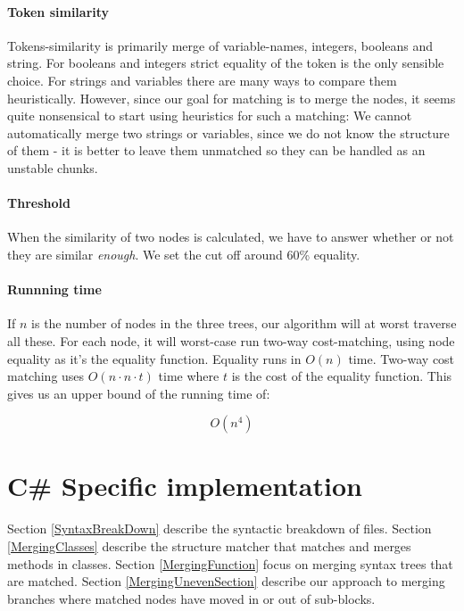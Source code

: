 \documentclass[11pt]{article}
\begin{document}
\paragraph{Token similarity} Tokens-similarity is primarily merge of variable-names, integers, booleans and string. For booleans and integers strict equality of the token is the only sensible choice. For strings and variables there are many ways to compare them heuristically. However, since our goal for matching is to merge the nodes, it seems quite nonsensical to start using heuristics for such a matching: We cannot automatically merge two strings or variables, since we do not know the structure of them - it is better to leave them unmatched so they can be handled as an unstable chunks.

\paragraph{Threshold} When the similarity of two nodes is calculated, we have to answer whether or not they are similar \textit{enough}. We set the cut off around 60\% equality.


\paragraph{Runnning time} If $n$ is the number of nodes in the three trees, our algorithm will at worst traverse all these. For each node, it will worst-case run two-way cost-matching, using node equality as it's the equality function. Equality runs in $O(n)$ time. Two-way cost matching uses $O(n \cdot n \cdot t)$ time where $t$ is the cost of the equality function.   This gives us an upper bound of the running time of:

\begin{equation}
O(n^4) \nonumber
\end{equation}
\clearpage
\section{C\# Specific implementation}
Section \ref{SyntaxBreakDown} describe the syntactic breakdown of files. Section \ref{MergingClasses} describe the structure matcher that matches and merges methods in classes. Section \ref{MergingFunction} focus on merging syntax trees that are matched. Section \ref{MergingUnevenSection} describe our approach to merging branches where matched nodes have moved in or out of sub-blocks.
\end{document}

